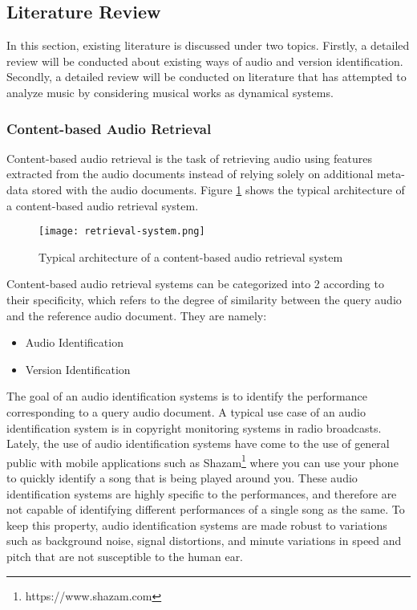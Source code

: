 \documentclass[../main.tex]{subfiles}
\begin{document}
\subsection{Literature Review}

In this section, existing literature is discussed under two topics. Firstly, a detailed review will be conducted about existing ways of audio and version identification. Secondly, a detailed review will be conducted on literature that has attempted to analyze music by considering musical works as dynamical systems. 

\subsubsection{Content-based Audio Retrieval}

\par
Content-based audio retrieval is the task of retrieving audio using features extracted from the audio documents instead of relying solely on additional meta-data stored with the audio documents. Figure \ref{fig:retrieval-system} shows the typical architecture of a content-based audio retrieval system.

\begin{figure}[H]
    \centering
    \texttt{[image: retrieval-system.png]}
    \caption{Typical architecture of a content-based audio retrieval system}
    \label{fig:retrieval-system}
\end{figure}

\par
Content-based audio retrieval systems can be categorized into 2 according to their specificity, which refers to the degree of similarity between the query audio and the reference audio document. They are namely:
\begin{itemize}
    \item Audio Identification
    \item Version Identification
\end{itemize}

\par
The goal of an audio identification systems is to identify the performance corresponding to a query audio document. A typical use case of an audio identification system is in copyright monitoring systems in radio broadcasts. Lately, the use of audio identification systems have come to the use of general public with mobile applications such as Shazam\footnote{https://www.shazam.com} where you can use your phone to quickly identify a song that is being played around you. These audio identification systems are highly specific to the performances, and therefore are not capable of identifying different performances of a single song as the same. To keep this property, audio identification systems are made robust to variations such as background noise, signal distortions, and minute variations in speed and pitch that are not susceptible to the human ear.
\end{document}
